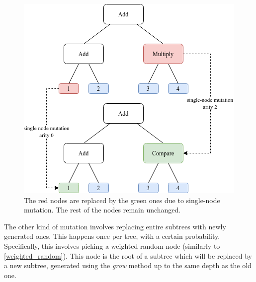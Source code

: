 \documentclass{report}
\begin{document}
\begin{figure}[ht]
    \centering
    \includegraphics[scale=0.75]{single_mutation}
    \caption{The red nodes are replaced by the green ones due to single-node mutation. The rest of the nodes remain unchanged.}
\end{figure}

The other kind of mutation involves replacing entire subtrees with newly generated ones. This happens once per tree, with a certain probability. Specifically, this involves picking a weighted-random node (similarly to \autoref{weighted_random}). This node is the root of a subtree which will be replaced by a new subtree, generated using the \emph{grow} method up to the same depth as the old one.
\end{document}
